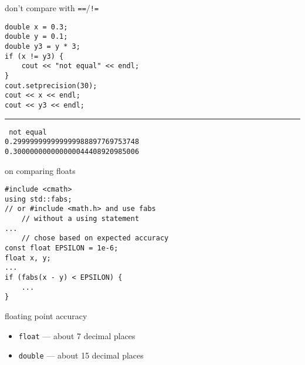 \begin{frame}[fragile,label=whyNotEq]{don't compare with {\tt ==}/{\tt !=}}
\lstset{
    language=C++,
    style=small
}
\begin{lstlisting}
double x = 0.3;
double y = 0.1;
double y3 = y * 3;
if (x != y3) {
    cout << "not equal" << endl;
}
cout.setprecision(30);
cout << x << endl;
cout << y3 << endl;
\end{lstlisting}
\hrule
\small \tt
not equal \\
0.299999999999999988897769753748 \\
0.300000000000000044408920985006 
\end{frame}

\begin{frame}[fragile,label=onCompareFloats]{on comparing floats}
\lstset{
    language=C++,
    style=small
}
\begin{lstlisting}
#include <cmath>
using std::fabs;
// or #include <math.h> and use fabs
    // without a using statement
...
    // chose based on expected accuracy
const float EPSILON = 1e-6; 
float x, y;
...
if (fabs(x - y) < EPSILON) {
    ...
}
\end{lstlisting}
\end{frame}

\begin{frame}[fragile,label=floatAcc]{floating point accuracy}
\lstset{
    language=C++,
    style=small
}
    \begin{itemize}
    \item \texttt{float} --- about 7 decimal places
    \item \texttt{double} --- about 15 decimal places
    \end{itemize}
\end{frame}
